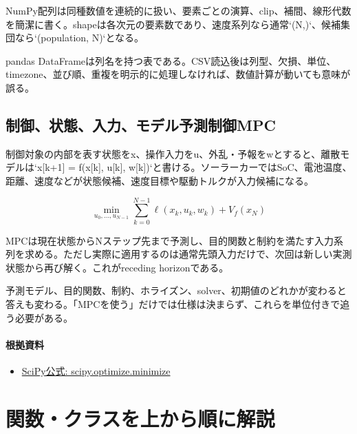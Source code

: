 \documentclass[a4paper,11pt]{article}
\begin{document}
NumPy配列は同種数値を連続的に扱い、要素ごとの演算、clip、補間、線形代数を簡潔に書く。shapeは各次元の要素数であり、速度系列なら通常`(N,)`、候補集団なら`(population, N)`となる。


pandas DataFrameは列名を持つ表である。CSV読込後は列型、欠損、単位、timezone、並び順、重複を明示的に処理しなければ、数値計算が動いても意味が誤る。



\subsection{制御、状態、入力、モデル予測制御MPC}
制御対象の内部を表す状態をx、操作入力をu、外乱・予報をwとすると、離散モデルは`x[k+1] = f(x[k], u[k], w[k])`と書ける。ソーラーカーではSoC、電池温度、距離、速度などが状態候補、速度目標や駆動トルクが入力候補になる。


\[
\min_{u_0,\ldots,u_{N-1}} \sum_{k=0}^{N-1}\ell(x_k,u_k,w_k)+V_f(x_N)
\]

MPCは現在状態からNステップ先まで予測し、目的関数と制約を満たす入力系列を求める。ただし実際に適用するのは通常先頭入力だけで、次回は新しい実測状態から再び解く。これがreceding horizonである。


予測モデル、目的関数、制約、ホライズン、solver、初期値のどれかが変わると答えも変わる。「MPCを使う」だけでは仕様は決まらず、これらを単位付きで追う必要がある。

\paragraph{根拠資料}
\begin{itemize}[leftmargin=1.6em]
\item \href{https://docs.scipy.org/doc/scipy/reference/generated/scipy.optimize.minimize.html}{SciPy公式: scipy.optimize.minimize}
\end{itemize}



        \section{関数・クラスを上から順に解説}
\end{document}
